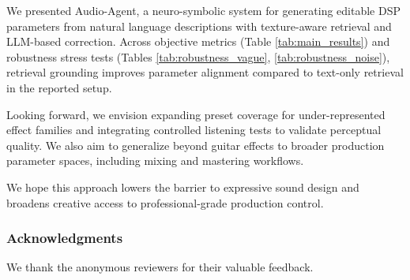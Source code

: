\documentclass{article}
\begin{document}
We presented Audio-Agent, a neuro-symbolic system for generating editable DSP parameters from natural language descriptions with texture-aware retrieval and LLM-based correction. Across objective metrics (Table \ref{tab:main_results}) and robustness stress tests (Tables \ref{tab:robustness_vague}, \ref{tab:robustness_noise}), retrieval grounding improves parameter alignment compared to text-only retrieval in the reported setup.

Looking forward, we envision expanding preset coverage for under-represented effect families and integrating controlled listening tests to validate perceptual quality. We also aim to generalize beyond guitar effects to broader production parameter spaces, including mixing and mastering workflows.

We hope this approach lowers the barrier to expressive sound design and broadens creative access to professional-grade production control.

\subsubsection*{Acknowledgments}
We thank the anonymous reviewers for their valuable feedback.



\end{document}
